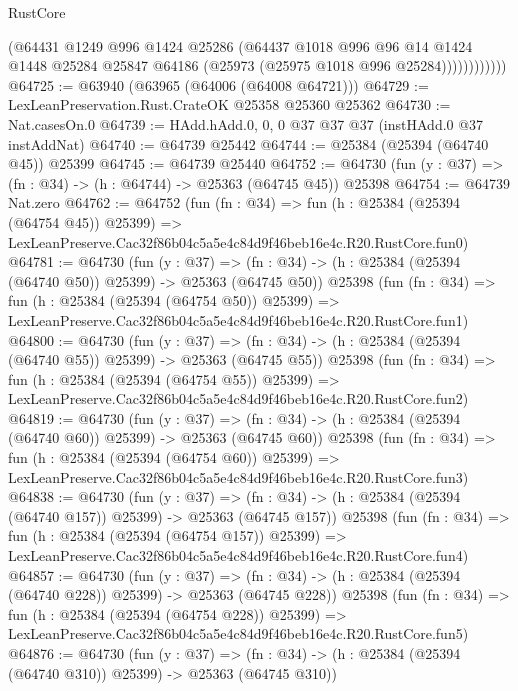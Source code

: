 \begin{lexlean}{RustCore}
\begin{coremodule}
                    (@64431
                      @1249
                      @996
                      @1424
                      @25286
                      (@64437
                        @1018
                        @996
                        @96
                        @14
                        @1424
                        @1448
                        @25284
                        @25847
                        @64186
                        (@25973 (@25975 @1018 @996 @25284))))))))))))
@64725 := @63940 (@63965 (@64006 (@64008 @64721)))
@64729 := LexLeanPreservation.Rust.CrateOK @25358 @25360 @25362
@64730 := Nat.casesOn.{0}
@64739 := HAdd.hAdd.{0, 0, 0} @37 @37 @37 (instHAdd.{0} @37 instAddNat)
@64740 := @64739 @25442
@64744 := @25384 (@25394 (@64740 @45)) @25399
@64745 := @64739 @25440
@64752 := @64730 (fun (y : @37) => (fn : @34) -> (h : @64744) -> @25363 (@64745 @45)) @25398
@64754 := @64739 Nat.zero
@64762 := @64752
    (fun (fn : @34) =>
    fun (h : @25384 (@25394 (@64754 @45)) @25399) =>
    LexLeanPreserve.Cac32f86b04c5a5e4c84d9f46beb16e4c.R20.RustCore.fun0)
@64781 := @64730
    (fun (y : @37) =>
    (fn : @34) -> (h : @25384 (@25394 (@64740 @50)) @25399) -> @25363 (@64745 @50))
    @25398
    (fun (fn : @34) =>
    fun (h : @25384 (@25394 (@64754 @50)) @25399) =>
    LexLeanPreserve.Cac32f86b04c5a5e4c84d9f46beb16e4c.R20.RustCore.fun1)
@64800 := @64730
    (fun (y : @37) =>
    (fn : @34) -> (h : @25384 (@25394 (@64740 @55)) @25399) -> @25363 (@64745 @55))
    @25398
    (fun (fn : @34) =>
    fun (h : @25384 (@25394 (@64754 @55)) @25399) =>
    LexLeanPreserve.Cac32f86b04c5a5e4c84d9f46beb16e4c.R20.RustCore.fun2)
@64819 := @64730
    (fun (y : @37) =>
    (fn : @34) -> (h : @25384 (@25394 (@64740 @60)) @25399) -> @25363 (@64745 @60))
    @25398
    (fun (fn : @34) =>
    fun (h : @25384 (@25394 (@64754 @60)) @25399) =>
    LexLeanPreserve.Cac32f86b04c5a5e4c84d9f46beb16e4c.R20.RustCore.fun3)
@64838 := @64730
    (fun (y : @37) =>
    (fn : @34) -> (h : @25384 (@25394 (@64740 @157)) @25399) -> @25363 (@64745 @157))
    @25398
    (fun (fn : @34) =>
    fun (h : @25384 (@25394 (@64754 @157)) @25399) =>
    LexLeanPreserve.Cac32f86b04c5a5e4c84d9f46beb16e4c.R20.RustCore.fun4)
@64857 := @64730
    (fun (y : @37) =>
    (fn : @34) -> (h : @25384 (@25394 (@64740 @228)) @25399) -> @25363 (@64745 @228))
    @25398
    (fun (fn : @34) =>
    fun (h : @25384 (@25394 (@64754 @228)) @25399) =>
    LexLeanPreserve.Cac32f86b04c5a5e4c84d9f46beb16e4c.R20.RustCore.fun5)
@64876 := @64730
    (fun (y : @37) =>
    (fn : @34) -> (h : @25384 (@25394 (@64740 @310)) @25399) -> @25363 (@64745 @310))

\end{coremodule}
\end{lexlean}
